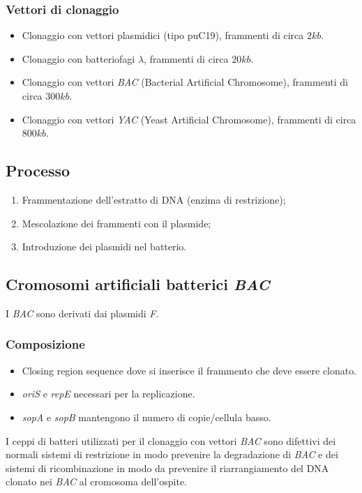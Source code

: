		\subsubsection{Vettori di clonaggio}
		\begin{multicols}{2}
			\begin{itemize}
    				\item Clonaggio con vettori plasmidici (tipo puC19), frammenti di circa $2kb$.
    				\item Clonaggio con batteriofagi $\lambda$, frammenti di circa $20 kb$.
				\item Clonaggio con vettori \emph{BAC} (Bacterial Artificial Chromosome), frammenti di circa $300 kb$. 
				\item Clonaggio con vettori \emph{YAC} (Yeast Artificial Chromosome), frammenti di circa $800 kb$.
			\end{itemize}
		\end{multicols}


	\subsection{Processo}
	\begin{enumerate}
    		\item Frammentazione dell'estratto di DNA (enzima di restrizione); 
    		\item Mescolazione dei frammenti con il plasmide; 
    		\item Introduzione dei plasmidi nel batterio.
	\end{enumerate}

	\subsection{Cromosomi artificiali batterici \emph{BAC}}
	I \emph{BAC} sono derivati dai plasmidi \emph{F}. 

		\subsubsection{Composizione}
		\begin{multicols}{2}
			\begin{itemize}
    				\item Closing region sequence dove si inserisce il frammento che deve essere clonato.
				\item \emph{oriS} e \emph{repE} necessari per la replicazione.
				\item \emph{sopA} e \emph{sopB} mantengono il numero di copie/cellula basso.
			\end{itemize}
		\end{multicols}
		I ceppi di batteri utilizzati per il clonaggio con vettori \emph{BAC} sono difettivi dei normali sistemi di restrizione in modo prevenire la degradazione di \emph{BAC} e dei sistemi di ricombinazione in modo da prevenire il riarrangiamento del DNA clonato nei \emph{BAC} al cromosoma dell'ospite.

